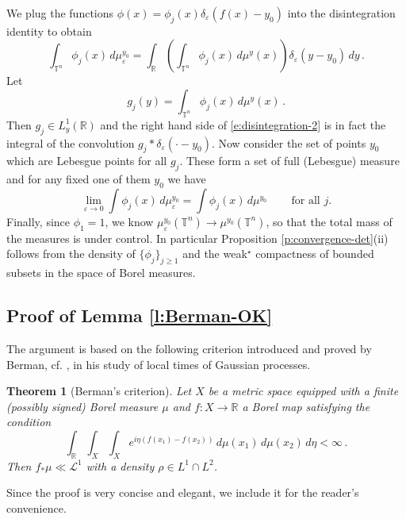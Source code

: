 \documentclass[11pt,reqno]{amsart}
\newcommand{\R}{\mathbb R}
\newtheorem{theorem}{Theorem}[section]
\theoremstyle{definition}
\numberwithin{equation}{section}
\begin{document}
We plug the functions $\phi(x)=\phi_j(x)\delta_{\varepsilon}(f(x)-y_0)$ into the disintegration identity to obtain
\begin{equation}\label{e:disintegration-2}
\int_{\mathbb T^n} \phi_j(x)\,d\mu_{\varepsilon}^{y_0}=\int_\R (\int_{\mathbb T^n} \phi_j(x)\,d\mu^y(x))\delta_{\varepsilon}(y-y_0)\,dy\, .
\end{equation}
Let 
\[
g_j(y)=\int_{\mathbb T^n} \phi_j(x)\,d\mu^y(x)\, .
\]
Then $g_j\in L^1_y(\R)$ and the right hand side of \eqref{e:disintegration-2} is in fact the integral of the convolution $g_j*\delta_{\varepsilon}(\cdot - y_0)$. Now consider the set of points $y_0$ which are Lebesgue points for all $g_j$. These form a set of full (Lebesgue) measure and for any fixed one of them $y_0$ we have 
\[
\lim_{\varepsilon\to0}\int \phi_j(x)\,d\mu^{y_0}_{\varepsilon}=\int \phi_j(x)\,d\mu^{y_0}\, \qquad 
\mbox{for all $j$.}
\]
Finally, since $\phi_1=1$, we know $\mu_{\varepsilon}^{y_0}(\mathbb T^n)\to \mu^{y_0}(\mathbb T^n)$, so that the total mass of the measures is under control. In particular Proposition \ref{p:convergence-det}(ii) follows from the density of $\{\phi_j\}_{j\geq 1}$ and the weak$^\star$ compactness of bounded subsets in the space of Borel measures. 

\subsection{Proof of Lemma \ref{l:Berman-OK}} The argument is based on the following criterion introduced and proved by Berman, cf. \cite[Lemma 2.1]{Ber69}, in his study of local times of Gaussian processes.

\begin{theorem}[Berman's criterion]\label{t:Berman-crit}
Let $X$ be a metric space equipped with a finite (possibly signed) Borel measure $\mu$ and $f:X\to\R$ a Borel map satisfying the condition
\begin{equation}\label{e:Berman}
\int_\R\int_{X}\int_{X}e^{i\eta(f(x_1)-f(x_2))}\,d\mu(x_1)\,d\mu(x_2)\,d\eta<\infty\, .
\end{equation}
Then $f_*\mu\ll\mathcal{L}^1$ with a density $\rho\in L^1\cap L^2$. 
\end{theorem}

Since the proof is very concise and elegant, we include it for the reader's convenience. 
\end{document}
